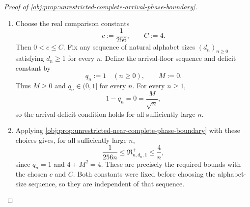 \begin{proof}[Proof of \cref{obj:prop:unrestricted-complete-arrival-phase-boundary}]
\begin{enumerate}
\item Choose the real comparison constants
\[
c:=\frac{1}{256},
\qquad C:=4.
\]
Then \(0<c\le C\). Fix any sequence of natural alphabet sizes \((d_n)_{n\ge0}\) satisfying \(d_n\ge1\) for every \(n\). Define the arrival-floor sequence and deficit constant by
\[
q_n:=1\quad(n\ge0),
\qquad M:=0.
\]
Thus \(M\ge0\) and \(q_n\in(0,1]\) for every \(n\). For every \(n\ge1\),
\[
1-q_n=0=\frac{M}{\sqrt n},
\]
so the arrival-deficit condition holds for all sufficiently large \(n\).

\item Applying \cref{obj:prop:unrestricted-near-complete-phase-boundary} with these choices gives, for all sufficiently large \(n\),
\[
\frac{1}{256n}
\le \mathfrak R^{+}_{n,d_n,1}
\le \frac{4}{n},
\]
since \(q_n=1\) and \(4+M^2=4\). These are precisely the required bounds with the chosen \(c\) and \(C\). Both constants were fixed before choosing the alphabet-size sequence, so they are independent of that sequence.
\end{enumerate}
\end{proof}

